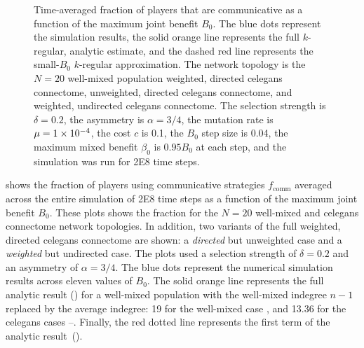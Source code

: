 \documentclass[pdflatex,lineno,referee,sn-mathphys-ay]{sn-jnl}
\begin{document}
\begin{figure}
  \centering
  
  \caption{
    Time-averaged fraction of players that are communicative as a function
    of the maximum joint benefit $B_0$.
    The blue dots represent the simulation results,
    the solid orange line represents the full $k$-regular, analytic estimate,
    and the dashed red line represents the small-$B_0$ $k$-regular approximation.
    The network topology is the
    $N=20$ well-mixed population
    weighted, directed \gls{celegans} connectome,
    unweighted, directed \gls{celegans} connectome,
    and
    weighted, undirected \gls{celegans} connectome.
    The selection strength is $\delta=0.2$,
    the asymmetry is $\alpha=3/4$,
    the mutation rate is $\mu=\num{1E-4}$,
    the cost $c$ is \num{0.1},
    the $B_0$ step size is \num{0.04},
    the maximum mixed benefit $\beta_0$ is $\num{0.95} B_0$ at each step,
    and the simulation was run for \num{2E8} time steps.
  }
  \label{fig:comm-frac}
\end{figure}

 shows the fraction of players
using communicative strategies $f_{\text{comm}}$ averaged across
the entire simulation of \num{2E8} time steps as a function
of the maximum joint benefit $B_0$.
These plots shows the fraction for the
$N=20$ well-mixed and
\gls{celegans} connectome network topologies.
In addition, two variants of the full weighted, directed \gls{celegans}
connectome are shown:
a  \emph{directed} but unweighted case
and
a  \emph{weighted} but undirected case.
The plots used a selection strength of $\delta=0.2$
and an asymmetry of $\alpha=3/4$.
The blue dots represent the numerical simulation results across eleven
values of $B_0$.
The solid orange line represents the full analytic
result () for a well-mixed population
with the well-mixed indegree $n-1$ replaced by the average
indegree: \num{19} for the well-mixed case ,
and \num{13.36} for the \gls{celegans} cases
--.
Finally, the red dotted line represents the first term
of the analytic result~().
\end{document}
